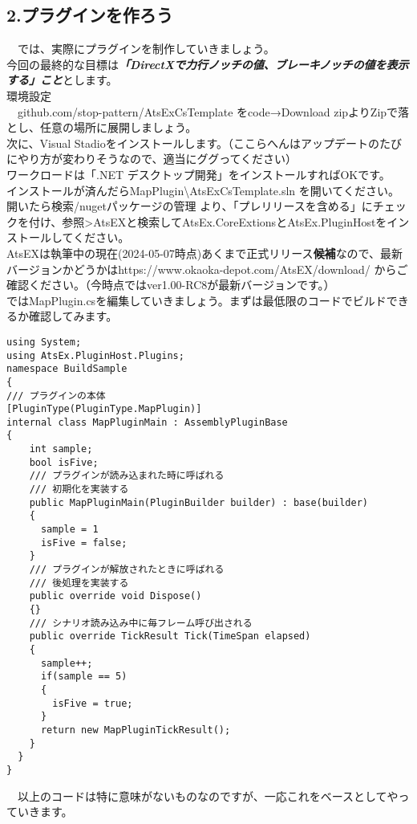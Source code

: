 \documentclass[b5paper,9pt,platex,dvipdfmx]{jsarticle}
\begin{document}
\begin{multicols*}{3}
\part*{2.プラグインを作ろう}
　では、実際にプラグインを制作していきましょう。\\
今回の最終的な目標は\textbf\textit{「DirectXで力行ノッチの値、ブレーキノッチの値を表示する」こと}とします。\\
{\large 環境設定}\\
　github.com/stop-pattern/AtsExCsTemplate をcode→Download zipよりZipで落とし、任意の場所に展開しましょう。\\
次に、Visual Stadioをインストールします。（ここらへんはアップデートのたびにやり方が変わりそうなので、適当にググってください）\\
ワークロードは「.NET デスクトップ開発」をインストールすればOKです。\\
インストールが済んだらMapPlugin\textbackslash AtsExCsTemplate.sln を開いてください。\\
開いたら検索/nugetパッケージの管理 より、「プレリリースを含める」にチェックを付け、参照>AtsEXと検索してAtsEx.CoreExtionsとAtsEx.PluginHostをインストールしてください。\\
AtsEXは執筆中の現在(2024-05-07時点)あくまで正式リリース\textbf{候補}なので、最新バージョンかどうかはhttps://www.okaoka-depot.com/AtsEX/download/ からご確認ください。（今時点ではver1.00-RC8が最新バージョンです。）\\
ではMapPlugin.csを編集していきましょう。まずは最低限のコードでビルドできるか確認してみます。
\begin{lstlisting}[caption=MapPlugin.cs]
using System;
using AtsEx.PluginHost.Plugins;
namespace BuildSample
{
/// プラグインの本体
[PluginType(PluginType.MapPlugin)]
internal class MapPluginMain : AssemblyPluginBase
{
    int sample;
    bool isFive;
    /// プラグインが読み込まれた時に呼ばれる
    /// 初期化を実装する
    public MapPluginMain(PluginBuilder builder) : base(builder)
    {
      sample = 1
      isFive = false;
    }
    /// プラグインが解放されたときに呼ばれる
    /// 後処理を実装する
    public override void Dispose()
    {}
    /// シナリオ読み込み中に毎フレーム呼び出される
    public override TickResult Tick(TimeSpan elapsed)
    {
      sample++;
      if(sample == 5)
      {
        isFive = true;
      }
      return new MapPluginTickResult();
    }
  }
}
\end{lstlisting}
　以上のコードは特に意味がないものなのですが、一応これをベースとしてやっていきます。\\

\end{multicols*}
\end{document}
